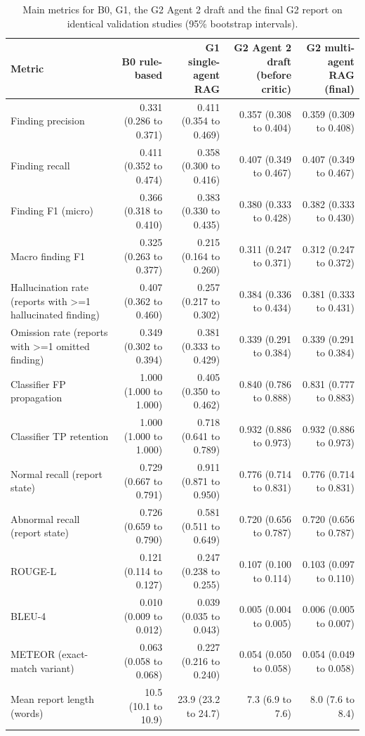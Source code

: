 \begin{table}[t]
\centering
\scriptsize
\begin{tabular}{lrrrr}
\hline
Metric & B0 rule-based & G1 single-agent RAG & G2 Agent 2 draft (before critic) & G2 multi-agent RAG (final) \\
\hline
Finding precision & 0.331 (0.286 to 0.371) & 0.411 (0.354 to 0.469) & 0.357 (0.308 to 0.404) & 0.359 (0.309 to 0.408) \\
Finding recall & 0.411 (0.352 to 0.474) & 0.358 (0.300 to 0.416) & 0.407 (0.349 to 0.467) & 0.407 (0.349 to 0.467) \\
Finding F1 (micro) & 0.366 (0.318 to 0.410) & 0.383 (0.330 to 0.435) & 0.380 (0.333 to 0.428) & 0.382 (0.333 to 0.430) \\
Macro finding F1 & 0.325 (0.263 to 0.377) & 0.215 (0.164 to 0.260) & 0.311 (0.247 to 0.371) & 0.312 (0.247 to 0.372) \\
Hallucination rate (reports with >=1 hallucinated finding) & 0.407 (0.362 to 0.460) & 0.257 (0.217 to 0.302) & 0.384 (0.336 to 0.434) & 0.381 (0.333 to 0.431) \\
Omission rate (reports with >=1 omitted finding) & 0.349 (0.302 to 0.394) & 0.381 (0.333 to 0.429) & 0.339 (0.291 to 0.384) & 0.339 (0.291 to 0.384) \\
Classifier FP propagation & 1.000 (1.000 to 1.000) & 0.405 (0.350 to 0.462) & 0.840 (0.786 to 0.888) & 0.831 (0.777 to 0.883) \\
Classifier TP retention & 1.000 (1.000 to 1.000) & 0.718 (0.641 to 0.789) & 0.932 (0.886 to 0.973) & 0.932 (0.886 to 0.973) \\
Normal recall (report state) & 0.729 (0.667 to 0.791) & 0.911 (0.871 to 0.950) & 0.776 (0.714 to 0.831) & 0.776 (0.714 to 0.831) \\
Abnormal recall (report state) & 0.726 (0.659 to 0.790) & 0.581 (0.511 to 0.649) & 0.720 (0.656 to 0.787) & 0.720 (0.656 to 0.787) \\
ROUGE-L & 0.121 (0.114 to 0.127) & 0.247 (0.238 to 0.255) & 0.107 (0.100 to 0.114) & 0.103 (0.097 to 0.110) \\
BLEU-4 & 0.010 (0.009 to 0.012) & 0.039 (0.035 to 0.043) & 0.005 (0.004 to 0.005) & 0.006 (0.005 to 0.007) \\
METEOR (exact-match variant) & 0.063 (0.058 to 0.068) & 0.227 (0.216 to 0.240) & 0.054 (0.050 to 0.058) & 0.054 (0.049 to 0.058) \\
Mean report length (words) & 10.5 (10.1 to 10.9) & 23.9 (23.2 to 24.7) & 7.3 (6.9 to 7.6) & 8.0 (7.6 to 8.4) \\
\hline
\end{tabular}
\caption{Main metrics for B0, G1, the G2 Agent 2 draft and the final G2 report on identical validation studies (95\% bootstrap intervals).}
\label{tab:table2_g1_vs_g2_main_metrics}
\end{table}
